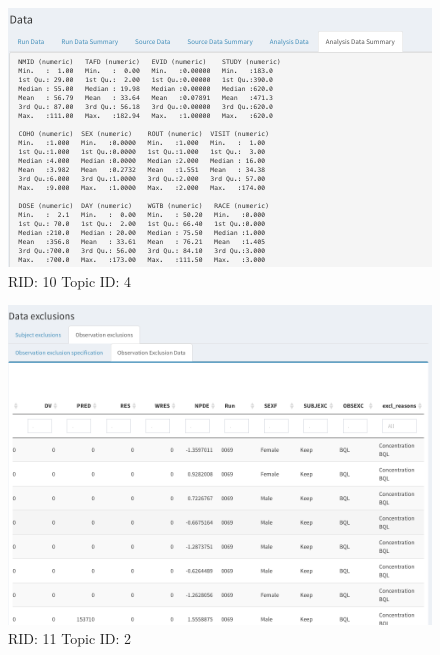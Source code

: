 \documentclass{article}
\begin{document}
\begin{figure}[hp]
\includegraphics[width=.8\textwidth]{screencaps/10-4-1.png}
\caption{RID: 10 Topic ID: 4}
\end{figure}
\newpage
\begin{figure}[hp]
\includegraphics[width=.8\textwidth]{screencaps/11-2-1.png}
\caption{RID: 11 Topic ID: 2}
\end{figure}
\end{document}
